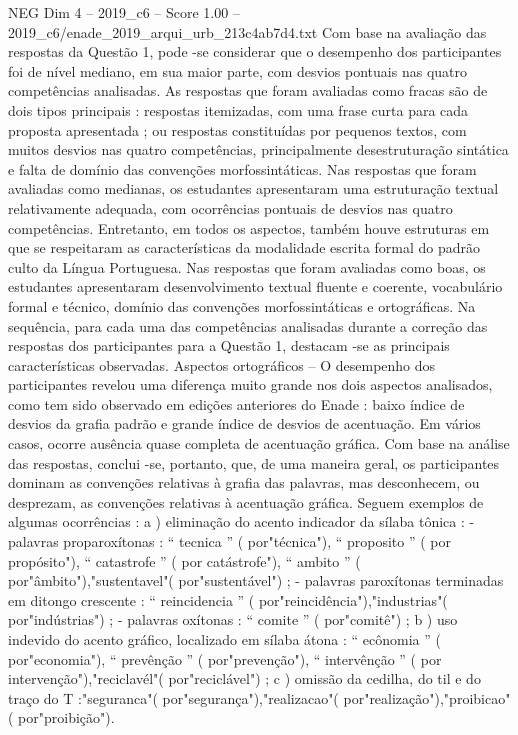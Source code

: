 \begin{textsample}{NEG Dim 4 – 2019\_c6 – Score 1.00 – 2019\_c6/enade\_2019\_arqui\_urb\_213c4ab7d4.txt}
Com base na avaliação das respostas da Questão 1, pode -se considerar que o desempenho dos participantes foi de nível mediano, em sua maior parte, com desvios pontuais nas quatro competências analisadas.
As respostas que foram avaliadas como fracas são de dois tipos principais : respostas itemizadas, com uma frase curta para cada proposta apresentada ; ou respostas constituídas por pequenos textos, com muitos desvios nas quatro competências, principalmente desestruturação sintática e falta de domínio das convenções morfossintáticas.
Nas respostas que foram avaliadas como medianas, os estudantes apresentaram uma estruturação textual relativamente adequada, com ocorrências pontuais de desvios nas quatro competências.
Entretanto, em todos os aspectos, também houve estruturas em que se respeitaram as características da modalidade escrita formal do padrão culto da Língua Portuguesa.
Nas respostas que foram avaliadas como boas, os estudantes apresentaram desenvolvimento textual fluente e coerente, vocabulário formal e técnico, domínio das convenções morfossintáticas e ortográficas.
Na sequência, para cada uma das competências analisadas durante a correção das respostas dos participantes para a Questão 1, destacam -se as principais características observadas.
Aspectos ortográficos – O desempenho dos participantes revelou uma diferença muito grande nos dois aspectos analisados, como tem sido observado em edições anteriores do Enade : baixo índice de desvios da grafia padrão e grande índice de desvios de acentuação.
Em vários casos, ocorre ausência quase completa de acentuação gráfica.
Com base na análise das respostas, conclui -se, portanto, que, de uma maneira geral, os participantes dominam as convenções relativas à grafia das palavras, mas desconhecem, ou desprezam, as convenções relativas à acentuação gráfica.
Seguem exemplos de algumas ocorrências : a ) eliminação do acento indicador da sílaba tônica : - palavras proparoxítonas : “ tecnica ” ( por"técnica"), “ proposito ” ( por propósito"), “ catastrofe ” ( por catástrofe"), “ ambito ” ( por"âmbito"),"sustentavel"( por"sustentável") ; - palavras paroxítonas terminadas em ditongo crescente : “ reincidencia ” ( por"reincidência"),"industrias"( por"indústrias") ; - palavras oxítonas : “ comite ” ( por"comitê") ; b ) uso indevido do acento gráfico, localizado em sílaba átona : “ ecônomia ” ( por"economia"), “ prevênção ” ( por"prevenção"), “ intervênção ” ( por intervenção"),"reciclavél"( por"reciclável") ; c ) omissão da cedilha, do til e do traço do T :"seguranca"( por"segurança"),"realizacao"( por"realização"),"proibicao"( por"proibição").

\end{textsample}
